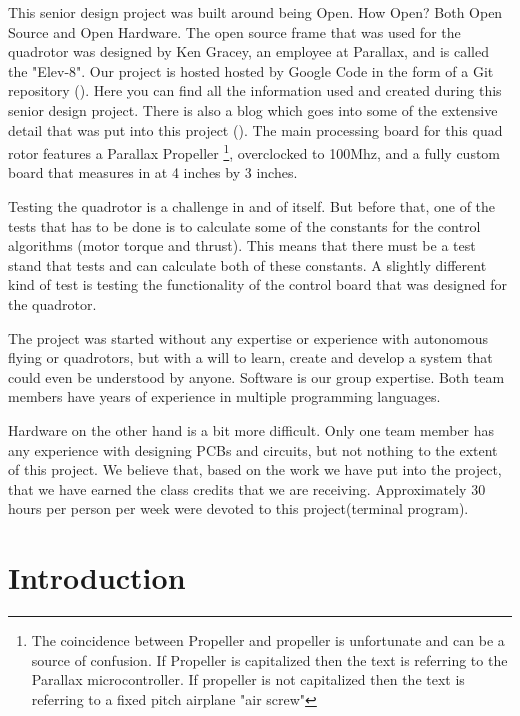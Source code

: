 \documentclass{article}
\numberwithin{equation}{section} %
\begin{document}
This senior design project was built around being Open. How Open? Both Open Source and Open Hardware. The open source frame that was used for the quadrotor was designed by Ken Gracey, an employee at Parallax, and is called the "Elev-8". Our project is hosted hosted by Google Code in the form of a Git repository (\cite{anzhelka_code}). Here you can find all the information used and created during this senior design project. There is also a blog which goes into some of the extensive detail that was put into this project (\cite{anzhelka_blog}). The main processing board for this quad rotor features a Parallax Propeller \footnote{The coincidence between Propeller and propeller is unfortunate and can be a source of confusion. If Propeller is capitalized then the text is referring to the Parallax microcontroller. If propeller is not capitalized then the text is referring to a fixed pitch airplane "air screw"}, overclocked to 100Mhz, and a fully custom board that measures in at 4 inches by 3 inches.

Testing the quadrotor is a challenge in and of itself. But before that, one of the tests that has to be done is to calculate some of the constants for the control algorithms (motor torque and thrust). This means that there must be a test stand that tests and can calculate both of these constants. A slightly different kind of test is testing the functionality of the control board that was designed for the quadrotor.

The project was started without any expertise or experience with autonomous flying or quadrotors, but with a will to learn, create and develop a system that could even be understood by anyone. Software is our group expertise. Both team members have years of experience in multiple programming languages. 

Hardware on the other hand is a bit more difficult. Only one team member has any experience with designing PCBs and circuits, but not nothing to the extent of this project. We believe that, based on the work we have put into the project, that we have earned the class credits that we are receiving. Approximately 30 hours per person per week were devoted to this project(terminal program).

\section{Introduction}
\end{document}

